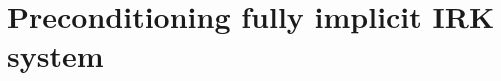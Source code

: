 \documentclass[a4paper,10pt]{article}
\begin{document}
\newpage
\section{Preconditioning fully implicit IRK system}

\end{document}
